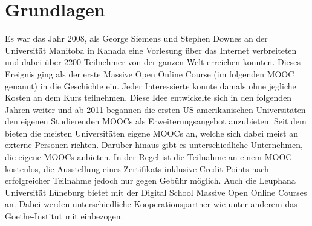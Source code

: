 \section{Grundlagen} %
\label{sec:grundlagen}
Es war das Jahr 2008, als George Siemens und Stephen Downes an der Universität Manitoba in Kanada eine Vorlesung über das Internet verbreiteten und dabei über 2200 Teilnehmer von der ganzen Welt erreichen konnten. Dieses Ereignis ging als der erste Massive Open Online Course (im folgenden MOOC genannt) in die Geschichte ein. Jeder Interessierte konnte damals ohne jegliche Kosten an dem Kurs teilnehmen. Diese Idee entwickelte sich in den folgenden Jahren weiter und ab 2011 begannen die ersten US-amerikanischen Universitäten den eigenen Studierenden MOOCs als Erweiterungsangebot anzubieten. Seit dem bieten die meisten Universitäten eigene MOOCs an, welche sich dabei meist an externe Personen richten. Darüber hinaus gibt es unterschiedliche Unternehmen, die eigene MOOCs anbieten. In der Regel ist die Teilnahme an einem MOOC kostenlos, die Ausstellung eines Zertifikats inklusive Credit Points nach erfolgreicher Teilnahme jedoch nur gegen Gebühr möglich.
\newline 
Auch die Leuphana Universität Lüneburg bietet mit der Digital School Massive Open Online Courses an. Dabei werden unterschiedliche Kooperationspartner wie unter anderem das Goethe-Institut mit einbezogen.



